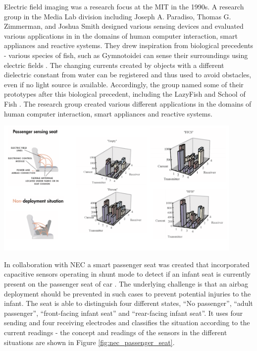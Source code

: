 Electric field imaging was a research focus at the MIT in the 1990s. A research group in the Media Lab division including Joseph A. Paradiso, Thomas G. Zimmerman, and Joshua Smith designed various sensing devices and evaluated various applications in in the domains of human computer interaction, smart appliances and reactive systems. They drew inspiration from biological precedents - various species of fish, such as Gymnotoidei can sense their surroundings using electric fields \cite{smith1999thesis}. The changing currents created by objects with a different dielectric constant from water can be registered and thus used to avoid obstacles, even if no light source is available. Accordingly, the group named some of their prototypes after this biological precedent, including the LazyFish and School of Fish \cite{smith1999thesis}. The research group created various different applications in the domains of human computer interaction, smart appliances and reactive systems.

\begin{minipage}{\linewidth}
\centering
\includegraphics[width=0.9\textwidth]{images/nec_passenger_seat}
\label{fig:nec_passenger_seat}
\end{minipage}

In collaboration with NEC a smart passenger seat was created that incorporated capacitive sensors operating in shunt mode to detect if an infant seat is currently present on the passenger seat of car \cite{grosse2012enhancing}. The underlying challenge is that an airbag deployment should be prevented in such cases to prevent potential injuries to the infant. The seat is able to distinguish four different states, “No passenger”, “adult passenger”, “front-facing infant seat” and “rear-facing infant seat”. It uses four sending and four receiving electrodes and classifies the situation according to the current readings - the concept and readings of the sensors in the different situations are shown in Figure \ref{fig:nec_passenger_seat}.

